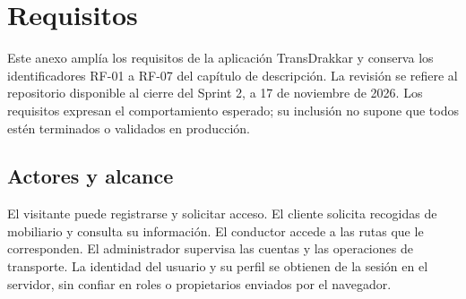 \chapter{Requisitos}
\label{anexo:requisitos}
Este anexo amplía los requisitos de la aplicación TransDrakkar y conserva los identificadores RF-01 a RF-07 del capítulo de descripción. La revisión se refiere al repositorio disponible al cierre del Sprint 2, a 17 de noviembre de 2026. Los requisitos expresan el comportamiento esperado; su inclusión no supone que todos estén terminados o validados en producción.

\section{Actores y alcance}
El visitante puede registrarse y solicitar acceso. El cliente solicita recogidas de mobiliario y consulta su información. El conductor accede a las rutas que le corresponden. El administrador supervisa las cuentas y las operaciones de transporte. La identidad del usuario y su perfil se obtienen de la sesión en el servidor, sin confiar en roles o propietarios enviados por el navegador.

